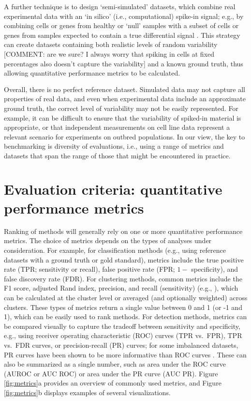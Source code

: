 \documentclass[12pt, a4paper]{article}
\begin{document}
A further technique is to design `semi-simulated' datasets, which combine real experimental data with an `in silico' (i.e., computational) spike-in signal; e.g., by combining cells or genes from healthy or `null' samples with a subset of cells or genes from samples expected to contain a true differential signal \citep{Arvaniti2017, Weber2018, Rigaill2018}. This strategy can create datasets containing both realistic levels of random variability [COMMENT: are we sure? I always worry that spiking in cells at fixed percentages also doesn't capture the variability] and a known ground truth, thus allowing quantitative performance metrics to be calculated.

Overall, there is no perfect reference dataset. Simulated data may not capture all properties of real data, and even when experimental data include an approximate ground truth, the correct level of variability may not be easily represented. For example, it can be difficult to ensure that the variability of spiked-in material is appropriate, or that independent measurements on cell line data represent a relevant scenario for experiments on outbred populations. In our view, the key to benchmarking is diversity of evaluations, i.e., using a range of metrics and datasets that span the range of those that might be encountered in practice.




\section*{Evaluation criteria: quantitative performance metrics}

Ranking of methods will generally rely on one or more quantitative performance metrics. The choice of metrics depends on the types of analyses under consideration. For example, for classification methods (e.g., using reference datasets with a ground truth or gold standard), metrics include the true positive rate (TPR; sensitivity or recall), false positive rate (FPR; $1 -$ specificity), and false discovery rate (FDR). For clustering methods, common metrics include the F1 score, adjusted Rand index, precision, and recall (sensitivity) (e.g., \citep{Duo2018, Weber2016, Aghaeepour2013}), which can be calculated at the cluster level or averaged (and optionally weighted) across clusters. These types of metrics return a single value between 0 and 1 (or -1 and 1), which can be easily used to rank methods. For detection methods, metrics can be compared visually to capture the tradeoff between sensitivity and specificity, e.g., using receiver operating characteristic (ROC) curves (TPR vs.\ FPR), TPR vs.\ FDR curves, or precision-recall (PR) curves; for some imbalanced datasets, PR curves have been shown to be more informative than ROC curves \citep{Saito2015}. These can also be summarized as a single number, such as area under the ROC curve (AUROC or AUC ROC) or area under the PR curve (AUC PR). Figure \ref{fig:metrics}a provides an overview of commonly used metrics, and Figure \ref{fig:metrics}b displays examples of several visualizations.
\end{document}
